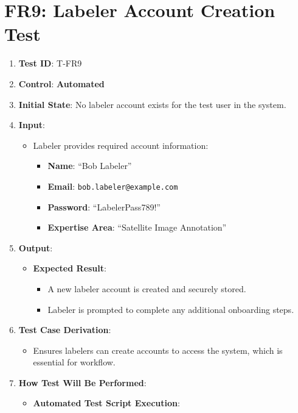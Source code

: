 \documentclass[12pt, titlepage]{article}
\begin{document}
\section*{FR9: Labeler Account Creation Test}

\begin{enumerate}
    \item \textbf{Test ID}: T-FR9
    \item \textbf{Control}: \textbf{Automated}
    \item \textbf{Initial State}: No labeler account exists for the test user in the system.
    \item \textbf{Input}:
    \begin{itemize}
        \item Labeler provides required account information:
        \begin{itemize}
            \item \textbf{Name}: ``Bob Labeler''
            \item \textbf{Email}: \texttt{bob.labeler@example.com}
            \item \textbf{Password}: ``LabelerPass789!''
            \item \textbf{Expertise Area}: ``Satellite Image Annotation''
        \end{itemize}
    \end{itemize}
    \item \textbf{Output}:
    \begin{itemize}
        \item \textbf{Expected Result}:
        \begin{itemize}
            \item A new labeler account is created and securely stored.
            \item Labeler is prompted to complete any additional onboarding steps.
        \end{itemize}
    \end{itemize}
    \item \textbf{Test Case Derivation}:
    \begin{itemize}
        \item Ensures labelers can create accounts to access the system, which is essential for workflow.
    \end{itemize}
    \item \textbf{How Test Will Be Performed}:
    \begin{itemize}
        \item \textbf{Automated Test Script Execution}:

\end{itemize}
\end{enumerate}
\end{document}
